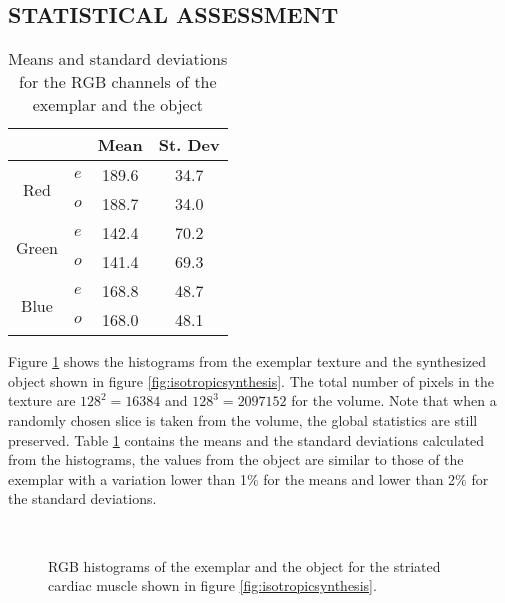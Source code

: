 \subsection{\uppercase{Statistical assessment }}
\label{sec:Statistics}

\begin{table}[h]
\centering
\begin{tabular}{|c|c|c|c|}
  \hline
  & & Mean & St. Dev  \\
  \hline
  \multirow{2}{*}{Red} & $e$ & 189.6  & 34.7  \\
		       & $o$ & 188.7 & 34.0 \\
  \hline
  \multirow{2}{*}{Green} & $e$ & 142.4 & 70.2 \\
		         & $o$ & 141.4 & 69.3 \\
  \hline
  \multirow{2}{*}{Blue} & $e$ & 168.8  & 48.7 \\
		        & $o$ & 168.0  & 48.1 \\
  \hline
\end{tabular}
\caption{Means and standard deviations for the RGB channels of the exemplar and the object}
\label{tab:statshisto} 
\end{table}

Figure \ref{fig:histograms} shows the histograms from the exemplar texture and the synthesized object shown 
in figure \ref{fig:isotropicsynthesis}. The total number of pixels in the texture are $128^2 = 16384$ and
$128^3 = 2097152$ for the volume. Note that when a randomly chosen slice is taken from the volume, 
the global statistics are still preserved. 
Table \ref{tab:statshisto} contains the means and the standard deviations calculated from the histograms, the values
from the object are similar to those of the exemplar with a variation lower than 1$\%$ for the means and lower than 2$\%$ for the standard deviations. 

\begin{figure} 
 \centering  
 \\
 \caption{RGB histograms of the exemplar and the object for the striated
          cardiac muscle shown in figure \ref{fig:isotropicsynthesis}.}
 \label{fig:histograms} 
\end{figure}

